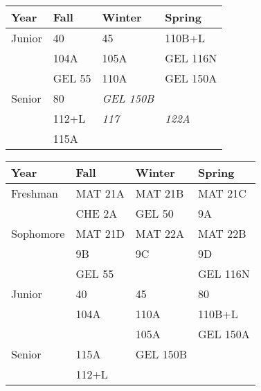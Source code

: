 \documentclass[12pt]{article}
\begin{document}
\begin{center}
\vskip 0.25cm
\begin{center}
\begin{tabular}{|l|l|l|l|}
\hline
Year      & Fall    & Winter & Spring \\
\hline
Junior    & 40         & 45           & 110B+L \\ 
          & 104A       & 105A         & GEL 116N \\ 
          & GEL 55     & 110A         & GEL 150A \\
\hline
Senior   & 80          & {\it GEL 150B} & \\
         & 112+L       & {\it 117}     & {\it 122A}  \\
         & 115A        &                & \\
\hline
\end{tabular}
\end{center}
\vskip 0.25cm
\begin{tabular}{|l|l|l|l|}
\hline
Year      & Fall    & Winter & Spring \\
\hline
Freshman  & MAT 21A  & MAT 21B  & MAT 21C \\
          & CHE 2A   & GEL 50   & 9A \\
\hline
Sophomore & MAT 21D  & MAT 22A  & MAT 22B \\ 
          & 9B       & 9C       & 9D \\
          & GEL 55   &          & GEL 116N \\
\hline
Junior    & 40       & 45       & 80\\
          & 104A     & 110A     & 110B+L\\
          &          & 105A     & GEL 150A \\         
\hline
Senior   & 115A      & GEL 150B & \\
         & 112+L     &          & \\
\hline 
\end{tabular}

\end{center}
\end{document}
